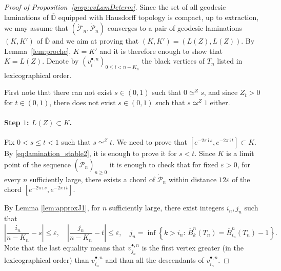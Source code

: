 \documentclass[AHL,XML,longabstracts,Unicode]{cedram}
\newcommand{\D}{\mathbb{D}}
\def\eps{\varepsilon}
\def\dFn{\dot{\mathcal{F}}_{n}}
\def\dPn{\dot{\mathcal{P}}_{n}}
\def\oB{\overline{B}}
\renewcommand{\epsilon}{\varepsilon}
\begin{document}
\begin{proof}[Proof of Proposition~\ref{prop:cvLamDeterm}]
Since the set of all geodesic laminations of $\overline{\D}$ equipped with Hausdorff topology is compact, up to extraction,
we may assume that $(\dFn, \dPn)$  converges to a pair of geodesic laminations $(K,K')$ of $\overline{\D}$ and we aim at proving that $(K,K')=( L(Z), L(Z))$. By Lemma~\ref{lem:proche}, $K=K'$ and it is therefore enough to show that $K=L(Z)$. Denote by $(v^{\bullet,n}_{i})_{0 \leq i < n-K_{n}}$ the black vertices of $T_{n}$ listed in lexicographical order.


First note that there can not exist $s \in (0,1)$ such that $0 \simeq^{Z} s$,
and since $Z_{t}>0$ for $t \in (0,1)$, there does not exist $s \in (0,1)$ such that $ s \simeq^{Z} 1$ either.

\paragraph*{Step $1$: $L(Z) \subset K$.}  Fix $0 < s \le t < 1$ such that  $s \simeq^Z t$.
We need to prove that $[e^{-2\pi\, \textrm{i}\, s}, e^{-2\pi\, \textrm{i}\, t}] \subset K$.
By \eqref{eq:lamination_stable2}, it is enough to prove it for $s<t$.
Since $K$ is a limit point of the sequence $(\dPn)_{n \ge 0}$
it is enough to check that for fixed $\epsilon>0$, for every $n$ sufficiently large,
there exists a chord of $\dPn$  within distance $12\epsilon$ of the chord $[e^{-2\pi\, \textrm{i}\, s}, e^{-2\pi\, \textrm{i}\, t}]$.

 By Lemma \ref{lem:approxJ1}, for $n$ sufficiently large, there exist integers $i_{n},j_{n}$ such that
\begin{equation}
\label{eq:injn}
    \left|\frac{i_{n}}{n-K_n} -s \right|  \le \eps, \quad \left|\frac{j_{n}}{n-K_n} -t \right|  \le \eps, \quad
    j_{n}= \inf \left\{k>i_{n}: \,  \oB^{n}_k(T_n)=\oB^{n}_{i_{n}}(T_n)-1 \right\}.
\end{equation}
Note that the last equality means that $v^{\bullet,n}_{j_{n}}$ is the first vertex greater (in the lexicographical order) than $v^{\bullet,n}_{i_{n}}$ and than all the descendants of $v^{\bullet,n}_{i_{n}}$.



\end{proof}
\end{document}
